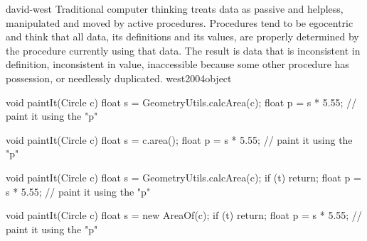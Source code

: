 \documentclass{article}
\begin{document}
\lnQuote
  {david-west}
  {Traditional computer thinking treats data as passive and helpless, manipulated and moved by active procedures. Procedures tend to be egocentric and think that all data, its definitions and its values, are properly determined by the procedure currently using that data. The result is data that is inconsistent in definition, inconsistent in value, inaccessible because some other procedure has possession, or needlessly duplicated.}
  {west2004object}


\begin{lnSnippet}
void paintIt(Circle c) {
  float s = GeometryUtils.calcArea(c);
  float p = s * 5.55;
  // paint it using the "p"
}
\end{lnSnippet}
\begin{lnSnippet}
void paintIt(Circle c) {
  float s = c.area();
  float p = s * 5.55;
  // paint it using the "p"
}
\end{lnSnippet}

\begin{lnSnippet}
void paintIt(Circle c) {
  float s = GeometryUtils.calcArea(c);
  if (t) { return; }
  float p = s * 5.55;
  // paint it using the "p"
}
\end{lnSnippet}
\begin{lnSnippet}
void paintIt(Circle c) {
  float s = new AreaOf(c);
  if (t) { return; }
  float p = s * 5.55;
  // paint it using the "p"
}
\end{lnSnippet}
\end{document}
